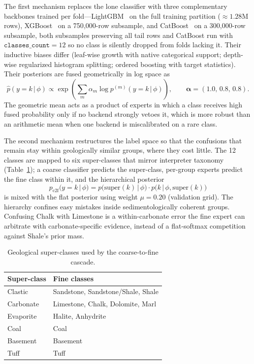 \documentclass[bdcc,article,submit,pdftex,moreauthors]{Definitions/mdpi}
\begin{document}
The first mechanism replaces the lone classifier with three complementary backbones trained
per fold---LightGBM~\cite{ke2017lightgbm} on the full training partition ($\approx\!1.28$M rows),
XGBoost~\cite{chen2016xgboost} on a 750{,}000-row subsample, and
CatBoost~\cite{prokhorenkova2018catboost} on a 300{,}000-row subsample, both subsamples
preserving all tail rows and CatBoost run with $\texttt{classes\_count}=12$ so no class is
silently dropped from folds lacking it. Their inductive biases differ (leaf-wise growth with
native categorical support; depth-wise regularized histogram splitting; ordered boosting with
target statistics). Their posteriors are fused geometrically in log space as
\begin{equation}
\hat p(y=k\,|\,\phi)\propto\exp\!\left(\sum_m \alpha_m\log p^{(m)}(y=k\,|\,\phi)\right),\qquad
\boldsymbol\alpha=(1.0,\,0.8,\,0.8).
\label{eq:geomean}
\end{equation}
The geometric mean acts as a product of experts in which a class receives high fused probability only
if no backend strongly vetoes it, which is more robust than an arithmetic mean when one
backend is miscalibrated on a rare class.

The second mechanism restructures the label space so that the confusions that remain stay
within geologically similar groups, where they cost little. The 12 classes are mapped to six
super-classes that mirror interpreter taxonomy
(Table~\ref{tab:superclass}); a coarse classifier predicts the super-class, per-group experts
predict the fine class within it, and the hierarchical posterior
\begin{equation}
p_\text{c2f}(y=k\,|\,\phi) = p\!\bigl(\text{super}(k)\,|\,\phi\bigr)\cdot p\!\bigl(k\,|\,\phi,\text{super}(k)\bigr)
\label{eq:c2f}
\end{equation}
is mixed with the flat posterior using weight $\mu=0.20$ (validation grid). The hierarchy
confines easy mistakes inside sedimentologically coherent groups. Confusing Chalk with
Limestone is a within-carbonate error the fine expert can arbitrate with carbonate-specific
evidence, instead of a flat-softmax competition against Shale's prior mass.

\begin{table}[H]
\caption{Geological super-classes used by the coarse-to-fine cascade.\label{tab:superclass}}
\begin{tabularx}{\textwidth}{lX}
\toprule
\textbf{Super-class} & \textbf{Fine classes}\\
\midrule
Clastic & Sandstone, Sandstone/Shale, Shale\\
Carbonate & Limestone, Chalk, Dolomite, Marl\\
Evaporite & Halite, Anhydrite\\
Coal & Coal\\
Basement & Basement\\
Tuff & Tuff\\
\bottomrule
\end{tabularx}
\end{table}
\end{document}
